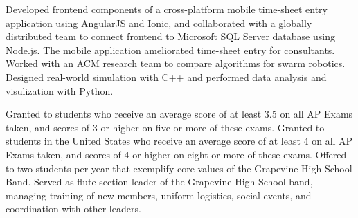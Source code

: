 \documentclass[
    10pt,
    A4,
    english,
    draft = false,
    twoside = false,
]{article}
\begin{document}
        {Developed frontend components of a cross-platform mobile time-sheet
        entry application using AngularJS and Ionic, and collaborated with a
        globally distributed team to connect frontend to Microsoft SQL Server
        database using Node.js. The mobile application ameliorated time-sheet
        entry for consultants.}
	{Worked with an ACM research team to compare algorithms for swarm
	robotics. Designed real-world simulation with C++ and performed data
	analysis and visulization with Python.}

	
	\newpage
	
        {Granted to students who receive an average score of at least 3.5 on
        all AP Exams taken, and scores of 3 or higher on five or more of these
        exams.}
        {Granted to students in the United States who receive an average score
        of at least 4 on all AP Exams taken, and scores of 4 or higher on eight
        or more of these exams.}
        {Offered to two students per year that exemplify core values of the
        Grapevine High School Band.}
        {Served as flute section leader of the Grapevine High School band,
        managing training of new members, uniform logistics, social events, and
        coordination with other leaders.}
\end{document}
